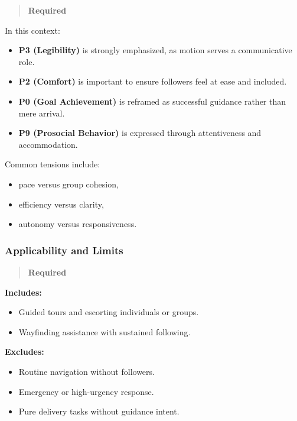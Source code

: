 \documentclass[utf8]{frontiers_suppmat} %
\providecommand{\tightlist}{%
  \setlength{\itemsep}{0pt}\setlength{\parskip}{0pt}}
\begin{document}
\begin{quote}
\textbf{Required}
\end{quote}

In this context:

\begin{itemize}
\tightlist
\item
  \textbf{P3 (Legibility)} is strongly emphasized, as motion serves a
  communicative role.
\item
  \textbf{P2 (Comfort)} is important to ensure followers feel at ease
  and included.
\item
  \textbf{P0 (Goal Achievement)} is reframed as successful guidance
  rather than mere arrival.
\item
  \textbf{P9 (Prosocial Behavior)} is expressed through attentiveness
  and accommodation.
\end{itemize}

Common tensions include:

\begin{itemize}
\tightlist
\item
  pace versus group cohesion,
\item
  efficiency versus clarity,
\item
  autonomy versus responsiveness.
\end{itemize}

\subsubsection{Applicability and Limits}\label{applicability-and-limits}

\begin{quote}
\textbf{Required}
\end{quote}

\textbf{Includes:}

\begin{itemize}
\tightlist
\item
  Guided tours and escorting individuals or groups.
\item
  Wayfinding assistance with sustained following.
\end{itemize}

\textbf{Excludes:}

\begin{itemize}
\tightlist
\item
  Routine navigation without followers.
\item
  Emergency or high-urgency response.
\item
  Pure delivery tasks without guidance intent.
\end{itemize}
\end{document}
